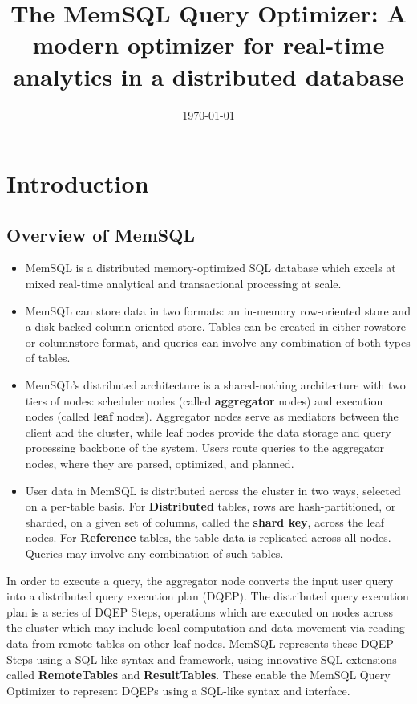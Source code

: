 \documentclass[11pt]{article}
\date{\today}
\title{The MemSQL Query Optimizer: A modern optimizer for real-time analytics in a distributed database}
\begin{document}
\maketitle
\section{Introduction}
\label{sec:orgb57ed39}

\subsection{Overview of MemSQL}
\label{sec:orgbbb5e16}
\begin{itemize}
\item MemSQL is a distributed memory-optimized SQL database which excels at mixed real-time analytical and
transactional processing at scale.
\item MemSQL can store data in two formats: an in-memory row-oriented store and a disk-backed
column-oriented store. Tables can be created in either rowstore or columnstore format, and queries
can involve any combination of both types of tables.
\item MemSQL's distributed architecture is a shared-nothing architecture with two tiers of nodes:
scheduler nodes (called \textbf{aggregator} nodes) and execution nodes (called \textbf{leaf} nodes). Aggregator nodes
serve as mediators between the client and the cluster, while leaf nodes provide the data storage and
query processing backbone of the system. Users route queries to the aggregator nodes, where they are
parsed, optimized, and planned.
\item User data in MemSQL is distributed across the cluster in two ways, selected on a per-table basis.
For \textbf{Distributed} tables, rows are hash-partitioned, or sharded, on a given set of columns, called the
\textbf{shard key}, across the leaf nodes. For \textbf{Reference} tables, the table data is replicated across all
nodes. Queries may involve any combination of such tables.
\end{itemize}


In order to execute a query, the aggregator node converts the input user query into a distributed
query execution plan (DQEP). The distributed query execution plan is a series of DQEP Steps,
operations which are executed on nodes across the cluster which may include local computation and data
movement via reading data from remote tables on other leaf nodes. MemSQL represents these DQEP Steps
using a SQL-like syntax and framework, using innovative SQL extensions called \textbf{RemoteTables} and
\textbf{ResultTables}. These enable the MemSQL Query Optimizer to represent DQEPs using a SQL-like syntax and
interface.
\end{document}
